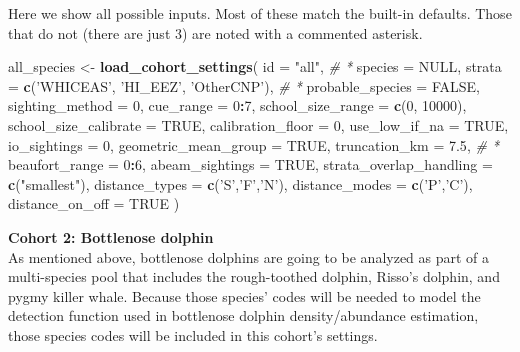\documentclass[
]{book}
\newenvironment{Shaded}{\begin{snugshade}}{\end{snugshade}}
\newcommand{\CommentTok}[1]{\textcolor[rgb]{0.56,0.35,0.01}{\textit{#1}}}
\newcommand{\DataTypeTok}[1]{\textcolor[rgb]{0.13,0.29,0.53}{#1}}
\newcommand{\DecValTok}[1]{\textcolor[rgb]{0.00,0.00,0.81}{#1}}
\newcommand{\FloatTok}[1]{\textcolor[rgb]{0.00,0.00,0.81}{#1}}
\newcommand{\KeywordTok}[1]{\textcolor[rgb]{0.13,0.29,0.53}{\textbf{#1}}}
\newcommand{\NormalTok}[1]{#1}
\newcommand{\OperatorTok}[1]{\textcolor[rgb]{0.81,0.36,0.00}{\textbf{#1}}}
\newcommand{\OtherTok}[1]{\textcolor[rgb]{0.56,0.35,0.01}{#1}}
\newcommand{\StringTok}[1]{\textcolor[rgb]{0.31,0.60,0.02}{#1}}
\begin{document}
Here we show all possible inputs. Most of these match the built-in defaults. Those that do not (there are just 3) are noted with a commented asterisk.

\begin{Shaded}
\begin{Highlighting}[]
\NormalTok{all_species <-}\StringTok{ }\KeywordTok{load_cohort_settings}\NormalTok{(}
  \DataTypeTok{id =} \StringTok{"all"}\NormalTok{, }\CommentTok{# *}
  \DataTypeTok{species =} \OtherTok{NULL}\NormalTok{, }
  \DataTypeTok{strata =} \KeywordTok{c}\NormalTok{(}\StringTok{'WHICEAS'}\NormalTok{, }\StringTok{'HI_EEZ'}\NormalTok{, }\StringTok{'OtherCNP'}\NormalTok{), }\CommentTok{# *}
  \DataTypeTok{probable_species =} \OtherTok{FALSE}\NormalTok{,}
  \DataTypeTok{sighting_method =} \DecValTok{0}\NormalTok{,}
  \DataTypeTok{cue_range =} \DecValTok{0}\OperatorTok{:}\DecValTok{7}\NormalTok{,}
  \DataTypeTok{school_size_range =} \KeywordTok{c}\NormalTok{(}\DecValTok{0}\NormalTok{, }\DecValTok{10000}\NormalTok{),}
  \DataTypeTok{school_size_calibrate =} \OtherTok{TRUE}\NormalTok{,}
  \DataTypeTok{calibration_floor =} \DecValTok{0}\NormalTok{,}
  \DataTypeTok{use_low_if_na =} \OtherTok{TRUE}\NormalTok{,}
  \DataTypeTok{io_sightings =} \DecValTok{0}\NormalTok{,}
  \DataTypeTok{geometric_mean_group =} \OtherTok{TRUE}\NormalTok{,}
  \DataTypeTok{truncation_km =} \FloatTok{7.5}\NormalTok{, }\CommentTok{# *}
  \DataTypeTok{beaufort_range =} \DecValTok{0}\OperatorTok{:}\DecValTok{6}\NormalTok{,}
  \DataTypeTok{abeam_sightings =} \OtherTok{TRUE}\NormalTok{,}
  \DataTypeTok{strata_overlap_handling =} \KeywordTok{c}\NormalTok{(}\StringTok{"smallest"}\NormalTok{),}
  \DataTypeTok{distance_types =} \KeywordTok{c}\NormalTok{(}\StringTok{'S'}\NormalTok{,}\StringTok{'F'}\NormalTok{,}\StringTok{'N'}\NormalTok{),}
  \DataTypeTok{distance_modes =} \KeywordTok{c}\NormalTok{(}\StringTok{'P'}\NormalTok{,}\StringTok{'C'}\NormalTok{),}
  \DataTypeTok{distance_on_off =} \OtherTok{TRUE}
\NormalTok{)}
\end{Highlighting}
\end{Shaded}

\textbf{Cohort 2: Bottlenose dolphin}\\
As mentioned above, bottlenose dolphins are going to be analyzed as part of a multi-species pool that includes the rough-toothed dolphin, Risso's dolphin, and pygmy killer whale. Because those species' codes will be needed to model the detection function used in bottlenose dolphin density/abundance estimation, those species codes will be included in this cohort's settings.
\end{document}
